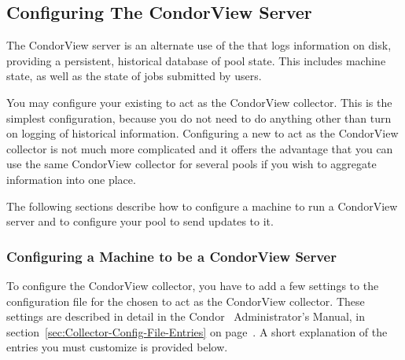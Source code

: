 \subsection{\label{sec:Contrib-CondorView-Install}
Configuring The CondorView Server}

The CondorView server is an alternate use of the
that logs information on disk, providing a 
persistent, historical database of pool state.
This includes machine state, as well as the state of jobs submitted by
users.

You may configure your existing  to act as the
CondorView collector.  This is the simplest configuration, because you
do not need to do anything other than turn on logging of historical
information.  Configuring a new  to act as the
CondorView collector is not much more complicated and it offers the
advantage that you can use the same CondorView collector for several pools
if you wish to aggregate information into one place.

The following sections describe how to configure a machine to run a
CondorView server and to configure your pool to send updates to it. 


\subsubsection{\label{sec:CondorView-Server-Setup}
Configuring a Machine to be a CondorView Server} 


To configure the CondorView collector, you have to add a few settings
to the configuration file for the  chosen to act
as the CondorView collector.
These settings are described in detail in the Condor \VersionNotice\ 
Administrator's Manual, in
section~\ref{sec:Collector-Config-File-Entries} on
page~\pageref{sec:Collector-Config-File-Entries}.
A short explanation of the entries you must customize is provided
below.

